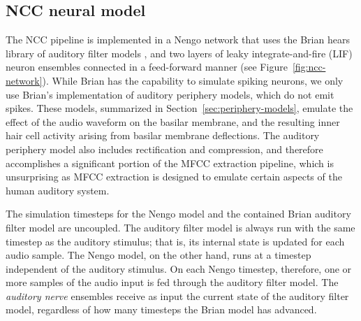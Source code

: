 \subsection{NCC neural model}
\label{sec:ncc-neural}

The NCC pipeline is implemented
in a Nengo network that uses
the Brian hears library
of auditory filter models
\citep{fontaine2011},
and two layers of
leaky integrate-and-fire (LIF) neuron ensembles
connected in a feed-forward manner
(see Figure~\ref{fig:ncc-network}).
While Brian has the capability
to simulate spiking neurons,
we only use Brian's implementation of
auditory periphery models,
which do not emit spikes.
These models,
summarized in Section~\ref{sec:periphery-models},
emulate the effect of the
audio waveform on the basilar membrane,
and the resulting inner hair cell activity
arising from basilar membrane deflections.
The auditory periphery model
also includes rectification and compression,
and therefore accomplishes a significant portion
of the MFCC extraction pipeline,
which is unsurprising as MFCC extraction
is designed to emulate certain aspects
of the human auditory system.


The simulation timesteps
for the Nengo model and the contained
Brian auditory filter model
are uncoupled.
The auditory filter model
is always run with the same timestep
as the auditory stimulus;
that is, its internal state is updated
for each audio sample.
The Nengo model, on the other hand,
runs at a timestep independent
of the auditory stimulus.
On each Nengo timestep,
therefore, one or more samples
of the audio input
is fed through the
auditory filter model.
The \textit{auditory nerve} ensembles
receive as input the current
state of the auditory filter model,
regardless of how many timesteps
the Brian model has advanced.

